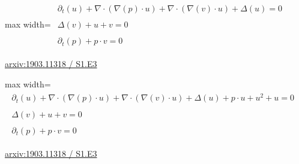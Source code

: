 \documentclass[10pt,a4paper]{article}
\begin{document}
\begin{minipage}{\linewidth}
\begin{center}\begin{adjustbox}{max width=\linewidth}$\displaystyle\begin{gathered}\begin{gathered}\partial_{t}(u)+\nabla\cdot(\nabla(p)\cdot u)+\nabla\cdot(\nabla(v)\cdot u)+\Delta(u)=0\end{gathered}\\[5pt]\begin{gathered}\Delta(v)+u+v=0\end{gathered}\\[5pt]\begin{gathered}\partial_{t}(p)+p\cdot v=0\end{gathered}\end{gathered}$\end{adjustbox}\end{center}
{\small \href{https://arxiv.org/html/1903.11318#S1.E3}{arxiv:1903.11318 / S1.E3}}\par
\end{minipage}\par\vspace{7mm}

\begin{minipage}{\linewidth}
\begin{center}\begin{adjustbox}{max width=\linewidth}$\displaystyle\begin{gathered}\begin{gathered}\partial_{t}(u)+\nabla\cdot(\nabla(p)\cdot u)+\nabla\cdot(\nabla(v)\cdot u)+\Delta(u)+p\cdot u+u^{2}+u=0\end{gathered}\\[5pt]\begin{gathered}\Delta(v)+u+v=0\end{gathered}\\[5pt]\begin{gathered}\partial_{t}(p)+p\cdot v=0\end{gathered}\end{gathered}$\end{adjustbox}\end{center}
{\small \href{https://arxiv.org/html/1903.11318#S1.E3}{arxiv:1903.11318 / S1.E3}}\par
\end{minipage}\par\vspace{7mm}
\end{document}
